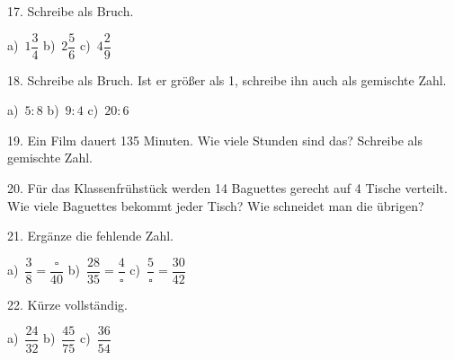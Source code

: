 \documentclass[11pt]{article}
\begin{document}
\begin{pfaufg}{}{17.}{}
Schreibe als Bruch. \par\vspace{3pt} a)~$1\dfrac{3}{4}$ \qquad b)~$2\dfrac{5}{6}$ \qquad c)~$4\dfrac{2}{9}$
\end{pfaufg}

\begin{pfaufg}{}{18.}{}
Schreibe als Bruch. Ist er größer als 1, schreibe ihn auch als gemischte Zahl. \par a)~$5 : 8$ \qquad b)~$9 : 4$ \qquad c)~$20 : 6$
\end{pfaufg}

\begin{pfaufg}{}{19.}{}
Ein Film dauert 135 Minuten. Wie viele Stunden sind das? Schreibe als gemischte Zahl.
\end{pfaufg}

\begin{pfaufg}{}{20.}{}
Für das Klassenfrühstück werden 14 Baguettes gerecht auf 4 Tische verteilt. Wie viele Baguettes bekommt jeder Tisch? Wie schneidet man die übrigen?
\end{pfaufg}

\begin{pfaufg}{}{21.}{}
Ergänze die fehlende Zahl. \par\vspace{3pt} a)~$\dfrac{3}{8} = \dfrac{\square}{40}$ \qquad b)~$\dfrac{28}{35} = \dfrac{4}{\square}$ \qquad c)~$\dfrac{5}{\square} = \dfrac{30}{42}$
\end{pfaufg}

\begin{pfaufg}{}{22.}{}
Kürze vollständig. \par\vspace{3pt} a)~$\dfrac{24}{32}$ \qquad b)~$\dfrac{45}{75}$ \qquad c)~$\dfrac{36}{54}$
\end{pfaufg}
\end{document}
